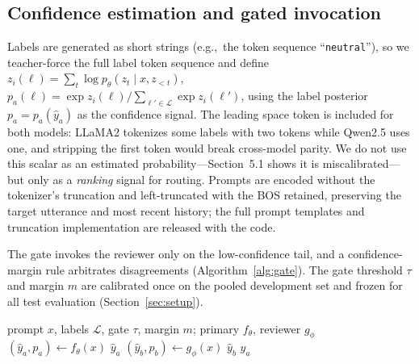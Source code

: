 \documentclass[final,5p,times,twocolumn]{elsarticle}
\begin{document}
\subsection{Confidence estimation and gated invocation}
\label{sec:scoring}
Labels are generated as short strings (e.g.,\ the token sequence
``\texttt{\textvisiblespace neutral}''), so we teacher-force the full
label token sequence and define
$z_i(\ell)=\sum_{t}\log p_\theta(z_t\mid x,z_{<t})$,
$p_a(\ell)=\exp z_i(\ell)/\sum_{\ell'\in\mathcal L}\exp z_i(\ell')$,
using the label posterior $p_a=p_a(\hat y_a)$ as the confidence signal. The
leading space token is included for both models: LLaMA2 tokenizes some labels
with two tokens while Qwen2.5 uses one, and stripping the first token would
break cross-model parity. We do not use this scalar as an estimated
probability---Section~5.1 shows it is miscalibrated---but only as a
\emph{ranking} signal for routing. Prompts are encoded without the
tokenizer's truncation and left-truncated with the BOS retained, preserving
the target utterance and most recent history; the full prompt templates and
truncation implementation are released with the code.

The gate invokes the reviewer only on the low-confidence tail, and a
confidence-margin rule arbitrates disagreements (Algorithm~\ref{alg:gate}).
The gate threshold $\tau$ and margin $m$ are calibrated once on the pooled
development set and frozen for all test evaluation (Section~\ref{sec:setup}).

\begin{algorithm}[t]
\caption{Selective cross-model verification at test time}
\label{alg:gate}
\begin{algorithmic}[1]
\Require prompt $x$, labels $\mathcal L$, gate $\tau$, margin $m$;
primary $f_\theta$, reviewer $g_\phi$
\State $(\hat y_a,p_a)\gets f_\theta(x)$ 
 \State \Return $\hat y_a$ 
\EndIf
\State $(\hat y_b,p_b)\gets g_\phi(x)$
  \State \Return $\hat y_b$ 
\Else \State \Return $\hat y_a$
\EndIf
\end{algorithmic}
\end{algorithm}
\end{document}
